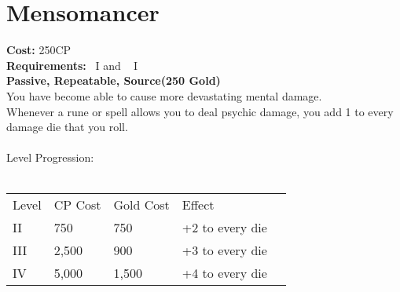 \section{Mensomancer}\label{perk:mensomancer}
\textbf{Cost:} 250CP\\
\textbf{Requirements:}~ I and ~ I\\
\textbf{Passive, Repeatable, Source(250 Gold)}\\
You have become able to cause more devastating mental damage.\\
Whenever a rune or spell allows you to deal psychic damage, you add 1 to every damage die that you roll.\\
\\
Level Progression:\\
\\
\begin{tabular}{l | l | l | l | l}
    Level & CP Cost & Gold Cost &  Effect\\
    II & 750 & 750 & +2 to every die\\
    III & 2,500 & 900 & +3 to every die\\
    IV & 5,000 & 1,500 & +4 to every die\\
\end{tabular}